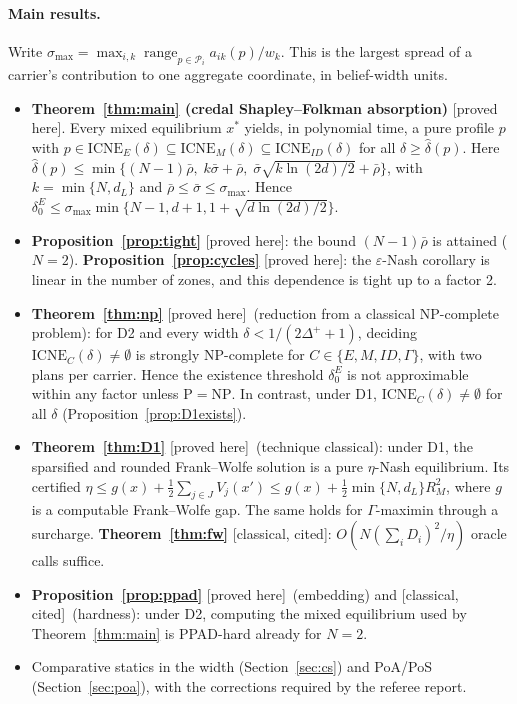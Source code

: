 \documentclass[11pt]{article}
\theoremstyle{definition}
\theoremstyle{remark}
\newcommand{\cP}{\mathcal{P}}
\newcommand{\ICNE}{\mathrm{ICNE}}
\newcommand{\PROVED}{\textsf{[proved here]}}
\newcommand{\CLASSICAL}{\textsf{[classical, cited]}}
\begin{document}
\paragraph{Main results.} Write $\sigma_{\max}=\max_{i,k}\operatorname{range}_{p\in\cP_i}a_{ik}(p)/w_k$. This is the largest spread of a carrier's contribution to one aggregate coordinate, in belief-width units.
\begin{itemize}
\item \textbf{Theorem~\ref{thm:main} (credal Shapley--Folkman absorption)} \PROVED. Every mixed equilibrium $x^*$ yields, in polynomial time, a pure profile $p$ with $p\in\ICNE_E(\delta)\subseteq\ICNE_M(\delta)\subseteq\ICNE_{ID}(\delta)$ for all $\delta\ge\hat\delta(p)$. Here $\hat\delta(p)\le\min\{(N-1)\bar\rho,\;k\bar\sigma+\bar\rho,\;\bar\sigma\sqrt{k\ln(2d)/2}+\bar\rho\}$, with $k=\min\{N,d_L\}$ and $\bar\rho\le\bar\sigma\le\sigma_{\max}$. Hence $\delta_0^E\le\sigma_{\max}\min\{N-1,d+1,1+\sqrt{d\ln(2d)/2}\}$.
\item \textbf{Proposition~\ref{prop:tight}} \PROVED: the bound $(N-1)\bar\rho$ is attained ($N=2$). \textbf{Proposition~\ref{prop:cycles}} \PROVED: the $\varepsilon$-Nash corollary is linear in the number of zones, and this dependence is tight up to a factor 2.
\item \textbf{Theorem~\ref{thm:np}} \PROVED\ (reduction from a classical NP-complete problem): for D2 and every width $\delta<1/(2\Delta^++1)$, deciding $\ICNE_C(\delta)\neq\emptyset$ is strongly NP-complete for $C\in\{E,M,ID,\Gamma\}$, with two plans per carrier. Hence the existence threshold $\delta_0^E$ is not approximable within any factor unless $\mathrm{P}=\mathrm{NP}$. In contrast, under D1, $\ICNE_C(\delta)\neq\emptyset$ for all $\delta$ (Proposition~\ref{prop:D1exists}).
\item \textbf{Theorem~\ref{thm:D1}} \PROVED\ (technique classical): under D1, the sparsified and rounded Frank--Wolfe solution is a pure $\eta$-Nash equilibrium. Its certified $\eta\le g(x)+\tfrac12\sum_{j\in J}V_j(x')\le g(x)+\tfrac12\min\{N,d_L\}R_M^2$, where $g$ is a computable Frank--Wolfe gap. The same holds for $\Gamma$-maximin through a surcharge. \textbf{Theorem~\ref{thm:fw}} \CLASSICAL: $O(N(\sum_iD_i)^2/\eta)$ oracle calls suffice.
\item \textbf{Proposition~\ref{prop:ppad}} \PROVED\ (embedding) and \CLASSICAL\ (hardness): under D2, computing the mixed equilibrium used by Theorem~\ref{thm:main} is PPAD-hard already for $N=2$.
\item Comparative statics in the width (Section~\ref{sec:cs}) and PoA/PoS (Section~\ref{sec:poa}), with the corrections required by the referee report.
\end{itemize}
\end{document}
